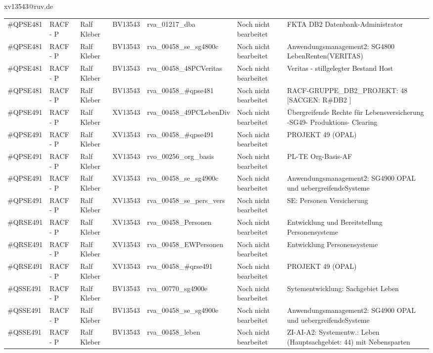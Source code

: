 \documentclass[a4paper,landscape,12pt]{letter}
\begin{document}
\begin{letter}{xv13543@ruv.de\hfill \break}
\begin{tiny}
\begin{longtable}{|p{35mm}|p{15mm}|p{25mm}|p{10mm}|p{40mm}|p{50mm}|p{50mm}|}
\#QPSE481 & RACF - P & Ralf Kleber & BV13543 & rva\_01217\_dba & Noch nicht bearbeitet & FKTA DB2 Datenbank-Administrator \\
\#QPSE481 & RACF - P & Ralf Kleber & BV13543 & rva\_00458\_se\_sg4800c & Noch nicht bearbeitet & Anwendungsmanagement2: SG4800 LebenRenten(VERITAS) \\
\#QPSE481 & RACF - P & Ralf Kleber & BV13543 & rva\_00458\_48PCVeritas & Noch nicht bearbeitet & Veritas - stillgelegter Bestand Host \\
\#QPSE481 & RACF - P & Ralf Kleber & BV13543 & rva\_00458\_\#qpse481 & Noch nicht bearbeitet & RACF-GRUPPE\_DB2\_PROJEKT: 48 [SACGEN: R\#DB2 ] \\
\#QPSE491 & RACF - P & Ralf Kleber & XV13543 & rva\_00458\_49PCLebenDiv & Noch nicht bearbeitet & Übergreifende Rechte für Lebensversicherung -SG49- Produktions- Clearing \\
\#QPSE491 & RACF - P & Ralf Kleber & XV13543 & rva\_00458\_\#qpse491 & Noch nicht bearbeitet & PROJEKT 49 (OPAL) \\
\#QPSE491 & RACF - P & Ralf Kleber & XV13543 & rvo\_00256\_org\_basis & Noch nicht bearbeitet & PL-TE Org-Basis-AF \\
\#QPSE491 & RACF - P & Ralf Kleber & XV13543 & rva\_00458\_se\_sg4900c & Noch nicht bearbeitet & Anwendungsmanagement2: SG4900 OPAL und uebergreifendeSysteme \\
\#QPSE491 & RACF - P & Ralf Kleber & XV13543 & rva\_00458\_se\_pers\_vers & Noch nicht bearbeitet & SE: Personen Versicherung \\
\#QRSE491 & RACF - P & Ralf Kleber & XV13543 & rva\_00458\_Personen & Noch nicht bearbeitet & Entwicklung und Bereitstellung Personensysteme \\
\#QRSE491 & RACF - P & Ralf Kleber & XV13543 & rva\_00458\_EWPersonen & Noch nicht bearbeitet & Entwicklung Personensysteme \\
\#QRSE491 & RACF - P & Ralf Kleber & XV13543 & rva\_00458\_\#qrse491 & Noch nicht bearbeitet & PROJEKT 49 (OPAL) \\
\#QSSE491 & RACF - P & Ralf Kleber & BV13543 & rva\_00770\_sg4900e & Noch nicht bearbeitet & Sytementwicklung: Sachgebiet Leben \\
\#QSSE491 & RACF - P & Ralf Kleber & BV13543 & rva\_00458\_se\_sg4900e & Noch nicht bearbeitet & Anwendungsmanagement2: SG4900 OPAL und uebergreifendeSysteme \\
\#QSSE491 & RACF - P & Ralf Kleber & BV13543 & rva\_00458\_leben & Noch nicht bearbeitet & ZI-AI-A2: Systementw.: Leben (Hauptsachgebiet: 44) mit Nebensparten \\

\end{longtable}
\end{tiny}
\end{letter}
\end{document}
